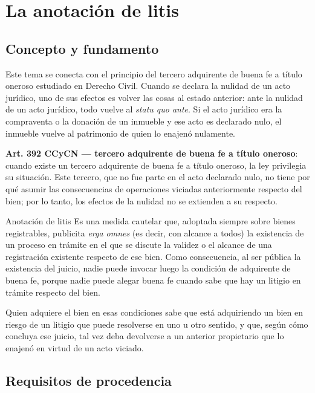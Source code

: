 \documentclass[12pt,oneside]{book}
\begin{document}
\chapter{La anotación de litis}

\section{Concepto y fundamento}

Este tema se conecta con el principio del tercero adquirente de buena fe a título oneroso estudiado en Derecho Civil. Cuando se declara la nulidad de un acto jurídico, uno de sus efectos es volver las cosas al estado anterior: ante la nulidad de un acto jurídico, todo vuelve al \textit{statu quo ante}. Si el acto jurídico era la compraventa o la donación de un inmueble y ese acto es declarado nulo, el inmueble vuelve al patrimonio de quien lo enajenó nulamente.

\begin{important}
\textbf{Art. 392 CCyCN --- tercero adquirente de buena fe a título oneroso}: cuando existe un tercero adquirente de buena fe a título oneroso, la ley privilegia su situación. Este tercero, que no fue parte en el acto declarado nulo, no tiene por qué asumir las consecuencias de operaciones viciadas anteriormente respecto del bien; por lo tanto, los efectos de la nulidad no se extienden a su respecto.
\end{important}

\begin{definition}{Anotación de litis}
Es una medida cautelar que, adoptada siempre sobre bienes registrables, publicita \textit{erga omnes} (es decir, con alcance a todos) la existencia de un proceso en trámite en el que se discute la validez o el alcance de una registración existente respecto de ese bien. Como consecuencia, al ser pública la existencia del juicio, nadie puede invocar luego la condición de adquirente de buena fe, porque nadie puede alegar buena fe cuando sabe que hay un litigio en trámite respecto del bien.
\end{definition}

Quien adquiere el bien en esas condiciones sabe que está adquiriendo un bien en riesgo de un litigio que puede resolverse en uno u otro sentido, y que, según cómo concluya ese juicio, tal vez deba devolverse a un anterior propietario que lo enajenó en virtud de un acto viciado.

\section{Requisitos de procedencia}
\end{document}

